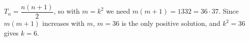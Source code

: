 $T_n=\dfrac{n(n+1)}{2}$, so with $m=k^2$ we need $m(m+1)=1332=36\cdot37$. Since $m(m+1)$ increases with $m$, $m=36$ is the only positive solution, and $k^2=36$ gives $k=\boxed{6}$.
